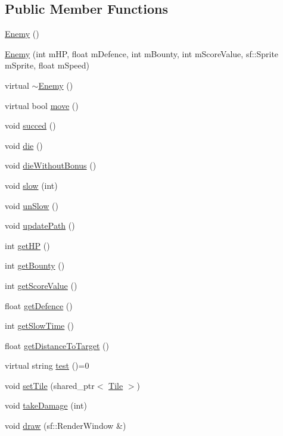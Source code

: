 \subsection*{Public Member Functions}
\begin{DoxyCompactItemize}
\item 
\hyperlink{class_enemy_a94f30d348b6d2840fd71675472ba38dd}{Enemy} ()
\item 
\hyperlink{class_enemy_a54489e1cd1e2fd48465effef7e45fd1b}{Enemy} (int m\+H\+P, float m\+Defence, int m\+Bounty, int m\+Score\+Value, sf\+::\+Sprite m\+Sprite, float m\+Speed)
\item 
virtual \hyperlink{class_enemy_ac0eec4755e28c02688065f9657150ac3}{$\sim$\+Enemy} ()
\item 
virtual bool \hyperlink{class_enemy_a8e0cfa58b8d27e254a0b3c6965962280}{move} ()
\item 
void \hyperlink{class_enemy_a0e46f5b36e6b038bfaef05979bb76325}{succed} ()
\item 
void \hyperlink{class_enemy_a04c451624958712b36546037fc25c601}{die} ()
\item 
void \hyperlink{class_enemy_ad8c2cd506c90a57adad1f94d9e4c25d2}{die\+Without\+Bonus} ()
\item 
void \hyperlink{class_enemy_aa5ddb1dc9aeba11ef0e502527bf6f412}{slow} (int)
\item 
void \hyperlink{class_enemy_a98a78c7c16c3eaca41d60fd54b9ff92a}{un\+Slow} ()
\item 
void \hyperlink{class_enemy_a39d2efd8625d3d8449cc45631d8b4f9b}{update\+Path} ()
\item 
int \hyperlink{class_enemy_ab1c5ecbd2567b509a5d4492764a28f5d}{get\+H\+P} ()
\item 
int \hyperlink{class_enemy_aecdda0124a341bace43f683a766ec6f7}{get\+Bounty} ()
\item 
int \hyperlink{class_enemy_ac04d0b26f6209586b87c8ecbaa0e0257}{get\+Score\+Value} ()
\item 
float \hyperlink{class_enemy_ae01d1b6fedb8f342b7f216ca463d7349}{get\+Defence} ()
\item 
int \hyperlink{class_enemy_af4d6253bc6c28ad1d1ff6deb4303347b}{get\+Slow\+Time} ()
\item 
float \hyperlink{class_enemy_a53020fcba7330809918946e150f8a591}{get\+Distance\+To\+Target} ()
\item 
virtual string \hyperlink{class_enemy_a37b2bae4f5a9e8d673aeb28880ded0bc}{test} ()=0
\item 
void \hyperlink{class_enemy_a0f1e1c58a06fd254c537bf8733e69b63}{set\+Tile} (shared\+\_\+ptr$<$ \hyperlink{class_tile}{Tile} $>$)
\item 
void \hyperlink{class_enemy_a6612d7486e4599d8fbc085c43168962f}{take\+Damage} (int)
\item 
void \hyperlink{class_enemy_ab6302a04e63f97255eb44fc8ce35d012}{draw} (sf\+::\+Render\+Window \&)
\end{DoxyCompactItemize}
